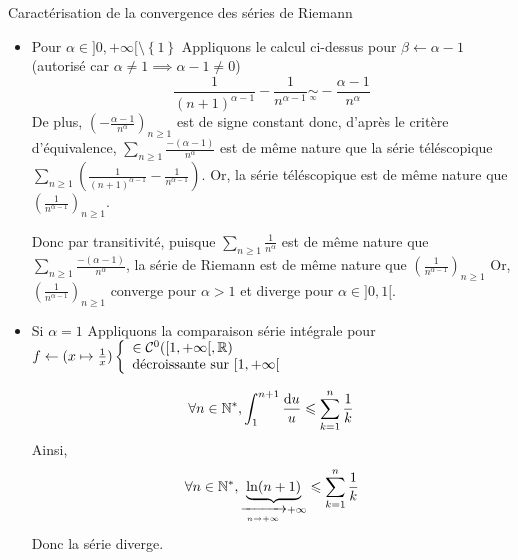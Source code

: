 \documentclass{article}
\begin{document}
\begin{question_kholle}{Caractérisation de la convergence des séries de Riemann}
\begin{itemize}[label=$\lozenge$]
        \begin{itemize}[label=$\star$]
            \item Pour $\alpha \in ]0, +\infty[ \setminus \left\{ 1 \right\}$
            Appliquons le calcul ci-dessus pour $\beta \leftarrow \alpha -1$ (autorisé car $\alpha \neq 1\implies \alpha-1 \neq 0$)
            $$\frac{1}{(n+1)^{\alpha-1}}-\frac{1}{n^{\alpha-1}} \underset{ \overset {\infty} {} } {\sim}
            -\frac{\alpha-1}{n^{\alpha}}$$
            De plus, $\left( -\frac{\alpha-1}{n^{\alpha}} \right)_{n\geqslant 1}$ est de signe constant donc, d'après le critère d'équivalence, $\sum_{n\geqslant 1} \frac{-(\alpha -1)}{n^{\alpha}}$ est de même nature que la série téléscopique $\sum_{n\geqslant 1}(\frac{1}{(n+1)^{\alpha-1}}-\frac{1}{n^{\alpha-1}} )$. Or, la série téléscopique est de même nature que $\left( \frac{1}{n^{\alpha-1}} \right)_{n\geqslant 1}$.
            
            Donc par transitivité, puisque $\sum_{n\geqslant 1} \frac{1}{n^{\alpha}}$ est de même nature que $\sum_{n\geqslant 1} \frac{-(\alpha-1)}{n^{\alpha}}$, la série de Riemann est de même nature que $\left( \frac{1}{n^{\alpha-1}} \right)_{n\geqslant 1}$
            Or, $\left( \frac{1}{n^{\alpha-1}} \right)_{n\geqslant 1}$ converge pour $\alpha>1$ et diverge pour $\alpha \in ]0, 1[$.
            
            \item Si $\alpha = 1$
            Appliquons la comparaison série intégrale pour $f \leftarrow (x \mapsto \frac{1}{x}) \left\{ \begin{array}{ll} \in \mathcal{C}^{0}([1, +\infty[, \mathbb R)\\ \text{décroissante sur }[1, +\infty[ \end{array}\right.$
            
            $$\forall n \in \mathbb N^{*}, \int_{1}^{n+1}  \frac{\mathrm{d}u}{u} \leqslant  \sum_{k=1}^{n} \frac{1}{k}$$
            Ainsi,
            $$\forall n \in \mathbb N^{*}, \underbrace{ \ln(n+1) }_{ \xrightarrow[n \to +\infty]{} +\infty } \leqslant \sum_{k=1}^{n} \frac{1}{k}$$
            Donc la série diverge.
        \end{itemize}
    \end{itemize}
\end{question_kholle}
\end{document}
